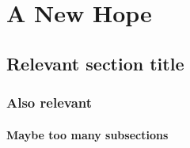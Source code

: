 \chapter{A New Hope}

\section{Relevant section title}

\subsection{Also relevant}

\subsubsection{Maybe too many subsections}